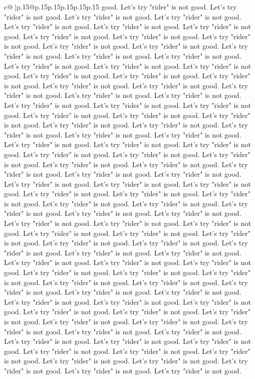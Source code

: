 \documentclass{article}
\begin{document}
{\begin{supertabular}{c@{$\;$}|p{.15\linewidth}@{}p{.15\linewidth}p{.15\linewidth}p{.15\linewidth}p{.15\linewidth}p{.15\linewidth}}
{{{good. Let's try "rider" is not good. Let's try "rider" is not good. Let's try "rider" is not good. Let's try "rider" is not good. Let's try "rider" is not good. Let's try "rider" is not good. Let's try "rider" is not good. Let's try "rider" is not good. Let's try "rider" is not good. Let's try "rider" is not good. Let's try "rider" is not good. Let's try "rider" is not good. Let's try "rider" is not good. Let's try "rider" is not good. Let's try "rider" is not good. Let's try "rider" is not good. Let's try "rider" is not good. Let's try "rider" is not good. Let's try "rider" is not good. Let's try "rider" is not good. Let's try "rider" is not good. Let's try "rider" is not good. Let's try "rider" is not good. Let's try "rider" is not good. Let's try "rider" is not good. Let's try "rider" is not good. Let's try "rider" is not good. Let's try "rider" is not good. Let's try "rider" is not good. Let's try "rider" is not good. Let's try "rider" is not good. Let's try "rider" is not good. Let's try "rider" is not good. Let's try "rider" is not good. Let's try "rider" is not good. Let's try "rider" is not good. Let's try "rider" is not good. Let's try "rider" is not good. Let's try "rider" is not good. Let's try "rider" is not good. Let's try "rider" is not good. Let's try "rider" is not good. Let's try "rider" is not good. Let's try "rider" is not good. Let's try "rider" is not good. Let's try "rider" is not good. Let's try "rider" is not good. Let's try "rider" is not good. Let's try "rider" is not good. Let's try "rider" is not good. Let's try "rider" is not good. Let's try "rider" is not good. Let's try "rider" is not good. Let's try "rider" is not good. Let's try "rider" is not good. Let's try "rider" is not good. Let's try "rider" is not good. Let's try "rider" is not good. Let's try "rider" is not good. Let's try "rider" is not good. Let's try "rider" is not good. Let's try "rider" is not good. Let's try "rider" is not good. Let's try "rider" is not good. Let's try "rider" is not good. Let's try "rider" is not good. Let's try "rider" is not good. Let's try "rider" is not good. Let's try "rider" is not good. Let's try "rider" is not good. Let's try "rider" is not good. Let's try "rider" is not good. Let's try "rider" is not good. Let's try "rider" is not good. Let's try "rider" is not good. Let's try "rider" is not good. Let's try "rider" is not good. Let's try "rider" is not good. Let's try "rider" is not good. Let's try "rider" is not good. Let's try "rider" is not good. Let's try "rider" is not good. Let's try "rider" is not good. Let's try "rider" is not good. Let's try "rider" is not good. Let's try "rider" is not good. Let's try "rider" is not good. Let's try "rider" is not good. Let's try "rider" is not good. Let's try "rider" is not good. Let's try "rider" is not good. Let's try "rider" is not good. Let's try "rider" is not good. Let's try "rider" is not good. Let's try "rider" is not good. Let's try "rider" is not good. Let's try "rider" is not good. Let's try "rider" is not good. Let's try "rider" is not good. Let's try "rider" is not good. Let's try "rider" is not good. Let's try "rider" is not good. Let's try "rider" is not good. }}}
\end{supertabular}}
\end{document}
